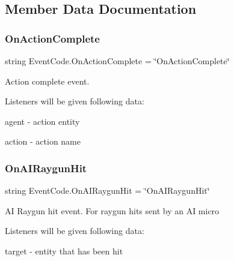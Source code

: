 \subsection{Member Data Documentation}
\mbox{\label{class_event_code_a55f432be68d01cd15b1bf04936237711}} 
\subsubsection{\texorpdfstring{OnActionComplete}{OnActionComplete}}
{\footnotesize\ttfamily string Event\+Code.\+On\+Action\+Complete = \char`\"{}On\+Action\+Complete\char`\"{}\hspace{0.3cm}{\ttfamily [static]}}



Action complete event. 

Listeners will be given following data\+:
\begin{DoxyItemize}
\item {\ttfamily agent} -\/ action entity
\item {\ttfamily action} -\/ action name 
\end{DoxyItemize}\mbox{\label{class_event_code_a0bb7a7064c6259124a48767341b0211f}} 
\subsubsection{\texorpdfstring{OnAIRaygunHit}{OnAIRaygunHit}}
{\footnotesize\ttfamily string Event\+Code.\+On\+A\+I\+Raygun\+Hit = \char`\"{}On\+A\+I\+Raygun\+Hit\char`\"{}\hspace{0.3cm}{\ttfamily [static]}}



AI Raygun hit event. For raygun hits sent by an AI micro 

Listeners will be given following data\+:
\begin{DoxyItemize}
\item {\ttfamily target} -\/ entity that has been hit 
\end{DoxyItemize}\mbox{\label{class_event_code_a379d0656758a2f6d45f7a6b497f2d1e0}} 
